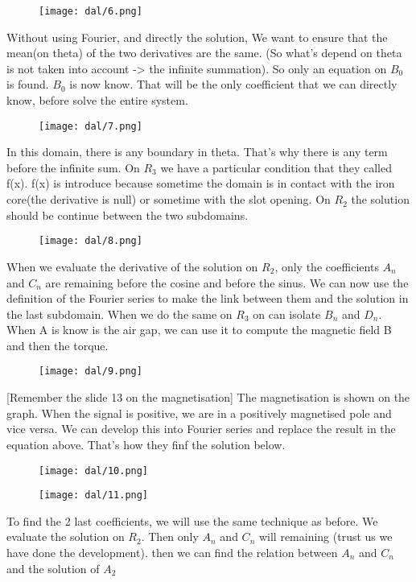 \begin{figure}[H]
    \centering
    \texttt{[image: dal/6.png]}
\end{figure}

Without using Fourier, and directly the solution, We want to ensure that the mean(on theta) of the two derivatives are the same. (So what's depend on theta is not taken into account -> the infinite summation). So only an equation on $B_0$ is found. $B_0$ is now know. That will be the only coefficient that we can directly know, before solve the entire system. 

\begin{figure}[H]
    \centering
    \texttt{[image: dal/7.png]}
\end{figure}
In this domain, there is any boundary in theta. That's why there is any term before the infinite sum. On $R_3$ we have a particular condition that they called f(x). f(x) is introduce because sometime the domain is in contact with the iron core(the derivative is null) or sometime with the slot opening. On $R_2$ the solution should be continue between the two subdomains.    
\begin{figure}[H]
    \centering
    \texttt{[image: dal/8.png]}
\end{figure}
When we evaluate the derivative of the solution on $R_2$, only the coefficients $A_n$ and $C_n$ are remaining before the cosine and before the sinus. We can now use the definition of the Fourier series to make the link between them and the solution in the last subdomain. When we do the same on $R_3$ on can isolate $B_n$ and $D_n$. When A is know is the air gap, we can use it to compute the magnetic field B and then the torque. 
\begin{figure}[H]
    \centering
    \texttt{[image: dal/9.png]}
\end{figure}
[Remember the slide 13 on the magnetisation]
The magnetisation is shown on the graph. When the signal is positive, we are in a positively magnetised pole and vice versa. We can develop this into Fourier series and replace the result in the equation above. That's how they finf the solution below.

\begin{figure}[H]
    \centering
    \texttt{[image: dal/10.png]}
\end{figure}
\begin{figure}[H]
    \centering
    \texttt{[image: dal/11.png]}
\end{figure}
To find the 2 last coefficients, we will use the same technique as before. We evaluate the solution on $R_2$. Then only $A_n$ and $C_n$ will remaining (trust us we have done the development). then we can find the relation between $A_n$ and $C_n$ and the solution of $A_2$

